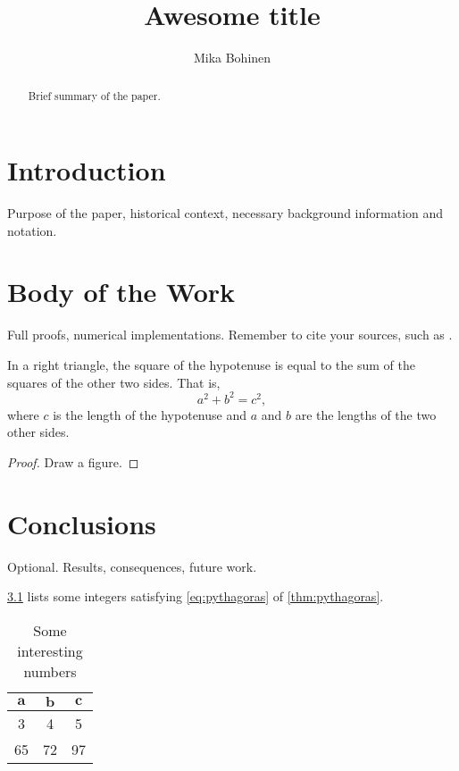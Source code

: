 \documentclass[a4paper, article, oneside, UKenglish]{memoir}
\title{Awesome title}
\author{Mika Bohinen}
\newcommand{\0}{\mathbf{0}}
\newcommand{\1}{\mathbf{1}}
\begin{document}
\projectfrontpage


\begin{abstract}
    \noindent
    Brief summary of the paper.
\end{abstract}


\chapter{Introduction}


Purpose of the paper, historical context, necessary background information and notation.


\chapter{Body of the Work}


Full proofs, numerical implementations.
Remember to cite your sources,
such as \cite{Hel17}.

\begin{theorem}[Pythagoras]
    \label{thm:pythagoras}
    In a right triangle,
    the square of the hypotenuse is equal to the sum of the squares of the other two sides.
    That is,
    \begin{equation}
        \label{eq:pythagoras}
            a^2 + b^2 = c^2,
    \end{equation}
    where \(c\) is the length of the hypotenuse and \(a\) and \(b\) are the lengths of the two other sides.
\end{theorem}

\begin{proof}
    Draw a figure.
\end{proof}


\chapter{Conclusions}


Optional. Results, consequences, future work.

\cref{tab:numbers} lists some integers satisfying \cref{eq:pythagoras} of \cref{thm:pythagoras}.

\begin{table}[htbp]
    \centering
    \begin{tabular}{@{}ccc@{}}
        \toprule
        \(\boldsymbol{a}\) & \(\boldsymbol{b}\) & \(\boldsymbol{c}\)
        \\
        \midrule
        3 & 4 & 5
        \\
        65 & 72 & 97
        \\
        \bottomrule
    \end{tabular}
    \caption{Some interesting numbers}
    \label{tab:numbers}
\end{table}


\printbibliography
\end{document}
